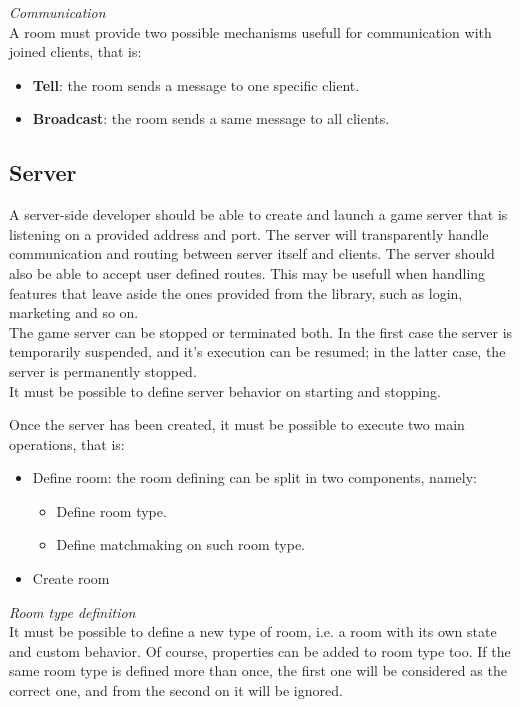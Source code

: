 \bigskip
\textit{Communication}
\\
A room must provide two possible mechanisms usefull for communication with joined clients, that is:
\begin{itemize}
\item \textbf{Tell}: the room sends a message to one specific client.
\item \textbf{Broadcast}: the room sends a same message to all clients. 
\end{itemize} 


\subsection{Server}

A server-side developer should be able to create and launch a game server that is listening on a provided address and port. The server will transparently handle communication and routing between server itself and clients. The server should also be able to accept user defined routes. This may be usefull when handling features that leave aside the ones provided from the library, such as login, marketing and so on.
\\
The game server can be stopped or terminated both. In the first case the server is temporarily suspended, and it's execution can be resumed; in the latter case, the server is permanently stopped.
\\
It must be possible to define server behavior on starting and stopping.

\bigskip
Once the server has been created, it must be possible to execute two main operations, that is:
\begin{itemize}
\item Define room: the room defining can be split in two components, namely:
  \begin{itemize}
  \item Define room type.
  \item Define matchmaking on such room type.
  \end{itemize}
\item Create room
\end{itemize}

\bigskip
\textit{Room type definition}
\\
It must be possible to define a new type of room, i.e. a room with its own state and custom behavior. Of course, properties can be added to room type too.
If the same room type is defined more than once, the first one will be considered as the correct one, and from the second on it will be ignored.

